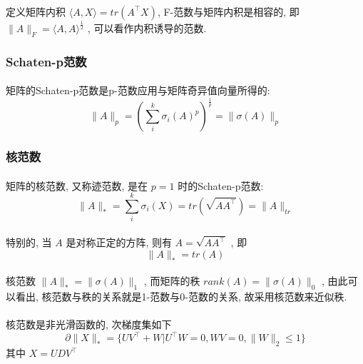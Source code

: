 \documentclass[a4paper, UTF8]{ctexart}				%
\numberwithin{equation}{section}				%
\begin{document}
				\paragraph{}
					\quad 定义矩阵内积 $\langle{A, X}\rangle = tr(A^\top X)$, F-范数与矩阵内积是相容的, 即 $\lVert{A}\rVert_F = \langle{A, A}\rangle^{\frac{1}{2}}$ , 可以看作内积诱导的范数.

			\subsubsection{Schaten-p范数}
				\paragraph{}
					\quad 矩阵的Schaten-p范数是p-范数应用与矩阵奇异值向量所得的:
					\[
							\lVert{A}\rVert_p
						=	(\sum_i^k \sigma_i(A)^p)^{\frac{1}{p}}
						=	\lVert{\sigma(A)}\rVert_p
					\]
			
			\subsubsection{核范数}
				\paragraph{}
					\quad 矩阵的核范数, 又称迹范数, 是在 $p = 1$ 时的Schaten-p范数:
					\[
							\lVert{A}\rVert_*
						=	\sum_i^k \sigma_i(X)
						=	tr(\sqrt{A A^\top})
						=	\lVert{A}\rVert_{tr}
					\]

				\paragraph{}
					\quad 特别的, 当 $A$ 是对称正定的方阵, 则有 $ A = \sqrt{A A^\top}$ , 即
					\[
						\lVert{A}\rVert_* = tr(A)
					\]

				\paragraph{}
					\quad 核范数 $\lVert{A}\rVert_* = \lVert{\sigma(A)}\rVert_1$ , 而矩阵的秩 $rank(A) = \lVert{\sigma(A)}\rVert_0$ , 由此可以看出, 核范数与秩的关系就是1-范数与0-范数的关系, 故采用核范数来近似秩.

				\paragraph{}
					\quad 核范数是非光滑函数的, 次梯度集如下
					\begin{equation}\label{NuNormSubGrad}
							\partial \lVert{X}\rVert_*
						=	\{U V^\top + W \vert U^\top W = 0,WV = 0, \lVert{W}\rVert_2 \leq 1\}
					\end{equation}
					其中 $X = U D V^\top$
\end{document}
